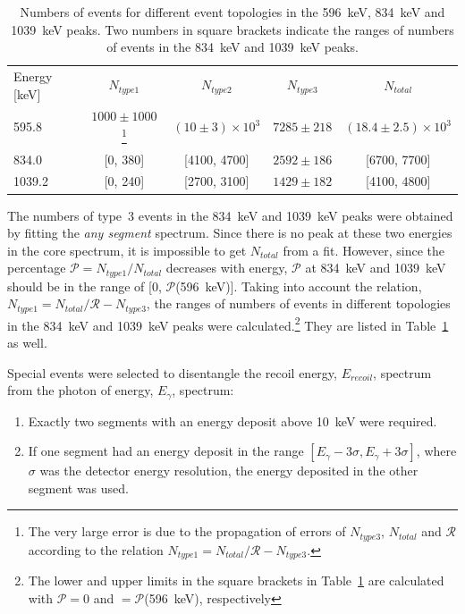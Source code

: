 \begin{table}[tbhp]
\centering
\caption{Numbers of events for different event topologies in the 
596~keV, 834~keV and 1039~keV peaks. Two numbers in square brackets 
indicate the ranges of numbers of events in the 834~keV and 1039~keV 
peaks.}
\label{tab:neu:ncore}
\begin{minipage}{\textwidth}\centering
\begin{tabular*}{\textwidth}{lcccc} \hline\noalign{\smallskip} Energy
[keV] & $N_{type 1}$ & $N_{type 2}$ & $N_{type 3}$ & $N_{total}$ \\
\noalign{\smallskip}\hline\noalign{\smallskip}
595.8 & $1000 \pm 1000$ \footnote{The very large error is due to the propagation of errors of $N_{type3}$, $N_{total}$ and $\mathcal{R}$ according to the relation $N_{type1} = N_{total} / \mathcal{R} - N_{type3}$.} & $(10 \pm 3)\times10^3$ & $7285 \pm 218$ & $(18.4 \pm 2.5)\times10^3$ \\
834.0  & [0, 380] & [4100, 4700] & $2592 \pm 186$ & [6700, 7700] \\
1039.2 & [0, 240] & [2700, 3100] & $1429 \pm 182$ & [4100, 4800] \\
\end{tabular*}
\end{minipage}
\end{table}

The numbers of type~3 events in the 834~keV and 1039~keV peaks were
obtained by fitting the \emph{any segment} spectrum. Since there is no
peak at these two energies in the core spectrum, it is impossible to
get $N_{total}$ from a fit. However, since the percentage $\mathcal{P}
= N_{type1} / N_{total}$ decreases with energy, $\mathcal{P}$ at
834~keV and 1039~keV should be in the range of [0,
$\mathcal{P}$(596~keV)]. Taking into account the relation, $N_{type1}
= N_{total}/\mathcal{R} - N_{type3}$, the ranges of numbers of events
in different topologies in the 834~keV and 1039~keV peaks were
calculated.\footnote{The lower and upper limits in the square brackets
in Table~\ref{tab:neu:ncore} are calculated with $\mathcal{P} = 0$ and
$= \mathcal{P}$(596~keV), respectively} They are listed in
Table~\ref{tab:neu:ncore} as well.

Special events were selected to disentangle the recoil energy,
$E_{recoil}$, spectrum from the photon of energy, $E_\gamma$,
spectrum:
\begin{enumerate}
\item Exactly two segments with an energy deposit above 10~keV were
required.
\item If one segment had an energy deposit in the range
$[E_\gamma-3\sigma, E_\gamma+3\sigma]$, where $\sigma$ was the
detector energy resolution, the energy deposited in the other segment
was used.
\end{enumerate}


